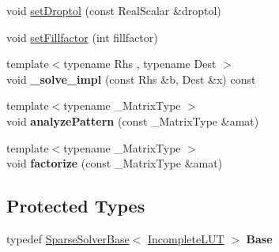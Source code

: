 \begin{DoxyCompactItemize}
\item 
void \mbox{\hyperlink{class_eigen_1_1_incomplete_l_u_t_a9628c5a595e9e984c72d1f8e671a6925}{set\+Droptol}} (const Real\+Scalar \&droptol)
\item 
void \mbox{\hyperlink{class_eigen_1_1_incomplete_l_u_t_a327767d12b55ff8a023f12a030051e17}{set\+Fillfactor}} (int fillfactor)
\item 
\mbox{\label{class_eigen_1_1_incomplete_l_u_t_a33ddb6572db03a6dd90982b1c0540322}} 
{\footnotesize template$<$typename Rhs , typename Dest $>$ }\\void {\bfseries \+\_\+solve\+\_\+impl} (const Rhs \&b, Dest \&x) const
\item 
\mbox{\label{class_eigen_1_1_incomplete_l_u_t_a28d9336b9af947fdb4dd6f1b6c167674}} 
{\footnotesize template$<$typename \+\_\+\+Matrix\+Type $>$ }\\void {\bfseries analyze\+Pattern} (const \+\_\+\+Matrix\+Type \&amat)
\item 
\mbox{\label{class_eigen_1_1_incomplete_l_u_t_a1015390a28e92591773a557c666e7284}} 
{\footnotesize template$<$typename \+\_\+\+Matrix\+Type $>$ }\\void {\bfseries factorize} (const \+\_\+\+Matrix\+Type \&amat)
\end{DoxyCompactItemize}
\subsection*{Protected Types}
\begin{DoxyCompactItemize}
\item 
\mbox{\label{class_eigen_1_1_incomplete_l_u_t_a7e9dcbd85dd2d73c81f4f243136d03a4}} 
typedef \mbox{\hyperlink{class_eigen_1_1_sparse_solver_base}{Sparse\+Solver\+Base}}$<$ \mbox{\hyperlink{class_eigen_1_1_incomplete_l_u_t}{Incomplete\+L\+UT}} $>$ {\bfseries Base}
\end{DoxyCompactItemize}
